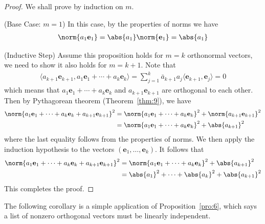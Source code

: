 \documentclass[thmcnt=section, color=blue, 12pt]{my-elegantbook}
\begin{document}
\begin{proof}
    We shall prove by induction on $m$.

    \par (Base Case: $m = 1$) In this case, by the properties of norms we have
    \begin{align*}
        \norm{a_1 \mathbf{e}_1} = \abs{a_1} \norm{\mathbf{e}_1} = \abs{a_1}
    \end{align*}

    \par (Inductive Step) Assume this proposition holds for $m = k$ orthonormal vectors, we need to show it also holds for $m = k+1$. Note that 
    \begin{align*}
		\langle
            a_{k+1} \mathbf{e}_{k+1},
            a_1 \mathbf{e}_1 + \cdots + a_k \mathbf{e}_k
        \rangle
        = \sum_{j=1}^k \bar{a}_{k+1} a_j \langle
            \mathbf{e}_{k+1},
            \mathbf{e}_{j}
        \rangle
        = 0
    \end{align*}
    which means that $a_1 \mathbf{e}_1 + \cdots + a_k \mathbf{e}_k$ and $a_{k+1} \mathbf{e}_{k+1}$ are orthogonal to each other. Then by Pythagorean theorem (Theorem~\ref{thm:9}), we have 
    \begin{align*}
        \norm{a_1 \mathbf{e}_1 + \cdots + a_k \mathbf{e}_k + a_{k+1} \mathbf{e}_{k+1}}^2 
        &= \norm{a_1 \mathbf{e}_1 + \cdots + a_k \mathbf{e}_k}^2 + \norm{a_{k+1} \mathbf{e}_{k+1}}^2 \\
        &= \norm{a_1 \mathbf{e}_1 + \cdots + a_k \mathbf{e}_k}^2 + \abs{a_{k+1}}^2
    \end{align*}
    where the last equality follows from the properties of norms. We then apply the induction hypothesis to the vectors $(\mathbf{e}_1, \ldots, \mathbf{e}_k)$. It follows that 
    \begin{align*}
        \norm{a_1 \mathbf{e}_1 + \cdots + a_k \mathbf{e}_k + a_{k+1} \mathbf{e}_{k+1}}^2 
        &= \norm{a_1 \mathbf{e}_1 + \cdots + a_k \mathbf{e}_k}^2 + \abs{a_{k+1}}^2 \\ 
        &= \abs{a_1}^2 + \cdots + \abs{a_k}^2 + \abs{a_{k+1}}^2
    \end{align*}
    This completes the proof.
\end{proof}


The following corollary is a simple application of Proposition~\ref{pro:6}, which says a list of nonzero orthogonal vectors must be linearly independent. 
\end{document}
